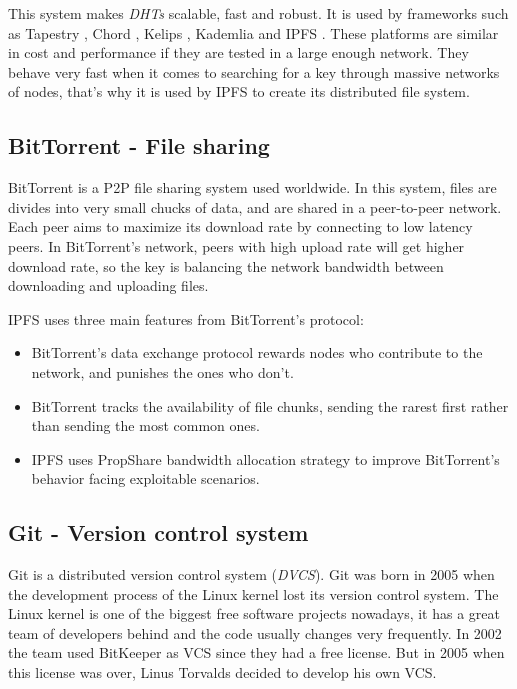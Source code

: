This system makes \emph{DHTs} scalable, fast and robust. It is used by
frameworks such as Tapestry \cite{zhao2004tapestry}, Chord
\cite{stoica2001chord}, Kelips \cite{gupta2003kelips}, Kademlia
\cite{maymounkov2002kademlia} and IPFS \cite{benet2014ipfs}. These platforms are
similar in cost and performance if they are tested in a large enough network.
They behave very fast when it comes to searching for a key through massive
networks of nodes\cite{li2004comparing}, that's why it is used by IPFS to create
its distributed file system.

\subsection{BitTorrent - File sharing}
BitTorrent \cite{cohen2003incentives} is a P2P file sharing system used
worldwide. In this system, files are divides into very small chucks of data, and
are shared in a peer-to-peer network. Each peer aims to maximize its download
rate by connecting to low latency peers. In BitTorrent's network, peers with
high upload rate will get higher download rate, so the key is balancing the
network bandwidth between downloading and uploading
files\cite{pouwelse2005bittorrent}.

IPFS uses three main features from BitTorrent's protocol\cite{benet2014ipfs}:
\begin{itemize}
\item BitTorrent's data exchange protocol rewards nodes who contribute to the
  network, and punishes the ones who don't.
\item BitTorrent tracks the availability of file chunks, sending the rarest
  first rather than sending the most common ones.
\item IPFS uses PropShare\cite{levin2008bittorrent} bandwidth allocation
  strategy to improve BitTorrent's behavior facing exploitable scenarios.
\end{itemize}

\subsection{Git - Version control system}
Git is a distributed version control system (\emph{DVCS})\cite{torvalds2010git}.
Git was born in 2005 when the development process of the Linux kernel lost its
version control system. The Linux kernel is one of the biggest free software
projects nowadays, it has a great team of developers behind and the code usually
changes very frequently. In 2002 the team used BitKeeper as VCS since they had a
free license. But in 2005 when this license was over, Linus Torvalds decided to
develop his own VCS\cite{spinellis2005version}.

